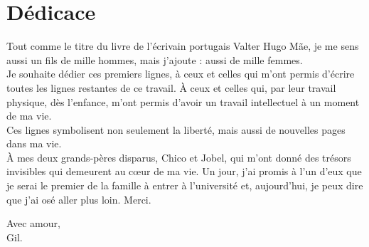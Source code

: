 
\chapter{Dédicace}
    
     Tout comme le titre du livre de l'écrivain portugais Valter Hugo Mãe, je me sens aussi un fils de mille hommes, mais j'ajoute : aussi de mille femmes.\\
     
     Je souhaite dédier ces premiers lignes, à ceux et celles qui m'ont permis d'écrire toutes les lignes restantes de ce travail. À ceux et celles qui, par leur travail physique, dès l'enfance, m'ont permis d'avoir un travail intellectuel à un moment de ma vie.\\
     
     Ces lignes symbolisent non seulement la liberté, mais aussi de nouvelles pages dans ma vie.\\
     
     À mes deux grands-pères disparus, Chico et Jobel, qui m'ont donné des trésors invisibles qui demeurent au cœur de ma vie. Un jour, j'ai promis à l'un d'eux que je serai le premier de la famille à entrer à l'université et, aujourd'hui, je peux dire que j'ai osé aller plus loin. Merci.\\
    
    \begin{flushright}
    Avec amour, \\
    Gil.
    \end{flushright}